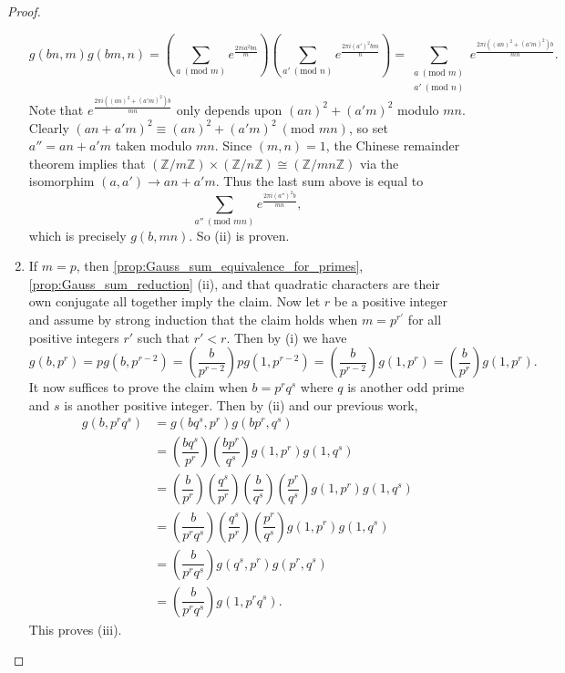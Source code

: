 \documentclass[12pt]{book}
\theoremstyle{definition}\newframedtheorem{method}{Method}
\newcommand{\legendre}[2]{\genfrac{(}{)}{0.5pt}{0}{#1}{#2}}
\newcommand{\tmod}[1]{\ \left(\text{mod }#1\right)}
\newcommand{\Z}{\mathbb{Z}}
\newcommand{\x}{\times}
\newcommand{\<}{\langle}
\renewcommand{\>}{\rangle}
\begin{document}
\begin{proof}
\begin{enumerate}[label=(\roman*)]
            \[
              g(bn,m)g(bm,n) = \left(\sum_{a \tmod{m}}e^{\frac{2\pi ia^{2}bn}{m}}\right)\left(\sum_{a' \tmod{n}}e^{\frac{2\pi i(a')^{2}bm}{n}}\right) = \sum_{\substack{a \tmod{m} \\ a' \tmod{n}}}e^{\frac{2\pi i\left((an)^{2}+(a'm)^{2}\right)b}{mn}}.
            \]
            Note that $e^{\frac{2\pi i\left((an)^{2}+(a'm)^{2}\right)b}{mn}}$ only depends upon $(an)^{2}+(a'm)^{2}$ modulo $mn$. Clearly $(an+a'm)^{2} \equiv (an)^{2}+(a'm)^{2} \tmod{mn}$, so set $a'' = an+a'm$ taken modulo $mn$. Since $(m,n) = 1$, the Chinese remainder theorem implies that $(\Z/m\Z) \x (\Z/n\Z) \cong (\Z/mn\Z)$ via the isomorphim $(a,a') \to an+a'm$. Thus the last sum above is equal to
            \[
              \sum_{a'' \tmod{mn}}e^{\frac{2\pi i(a'')^{2}b}{mn}},
            \]
            which is precisely $g(b,mn)$. So (ii) is proven.
          \item If $m = p$, then \cref{prop:Gauss_sum_equivalence_for_primes}, \cref{prop:Gauss_sum_reduction} (ii), and that quadratic characters are their own conjugate all together imply the claim. Now let $r$ be a positive integer and assume by strong induction that the claim holds when $m = p^{r'}$ for all positive integers $r'$ such that $r' < r$. Then by (i) we have
          \[
            g(b,p^{r}) = pg(b,p^{r-2}) = \legendre{b}{p^{r-2}}pg(1,p^{r-2}) = \legendre{b}{p^{r-2}}g(1,p^{r}) = \legendre{b}{p^{r}}g(1,p^{r}).
          \]
          It now suffices to prove the claim when $b = p^{r}q^{s}$ where $q$ is another odd prime and $s$ is another positive integer. Then by (ii) and our previous work,
          \begin{align*}
            g(b,p^{r}q^{s}) &= g(bq^{s},p^{r})g(bp^{r},q^{s}) \\
            &= \legendre{bq^{s}}{p^{r}}\legendre{bp^{r}}{q^{s}}g(1,p^{r})g(1,q^{s}) \\
            &= \legendre{b}{p^{r}}\legendre{q^{s}}{p^{r}}\legendre{b}{q^{s}}\legendre{p^{r}}{q^{s}}g(1,p^{r})g(1,q^{s}) \\
            &= \legendre{b}{p^{r}q^{s}}\legendre{q^{s}}{p^{r}}\legendre{p^{r}}{q^{s}}g(1,p^{r})g(1,q^{s}) \\
            &= \legendre{b}{p^{r}q^{s}}g(q^{s},p^{r})g(p^{r},q^{s}) \\
            &= \legendre{b}{p^{r}q^{s}}g(1,p^{r}q^{s}).
          \end{align*}
          This proves (iii).
        \end{enumerate}
      \end{proof}
\end{document}
